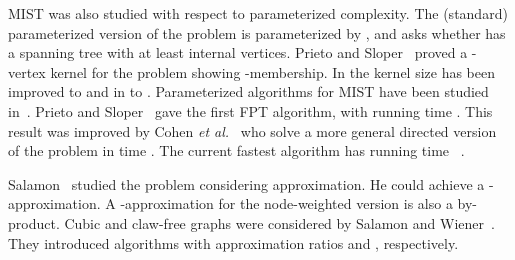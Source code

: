 \documentclass{llncs}
\newcommand{\longversion}[1]{#1}
\newcommand{\FPT}{\mbox{}}
\newcommand{\mist}{\textsc{MIST}\xspace}
\begin{document}
\mist was also studied with respect to parameterized complexity. The (standard) parameterized version of the problem is parameterized by , and asks
whether  
has a spanning tree with at least  internal vertices. Prieto and Sloper~\cite{PriSlo2003} proved a -vertex kernel for the problem showing
\FPT-membership. In \cite{\longversion{Pri2005,}PriSlo2005} the kernel size has been improved to  and in \cite{FominGST} to .
Parameterized algorithms for \mist have been studied in~\cite{CohenFGKSY09,FominGST,PriSlo2005}. Prieto and Sloper~\cite{PriSlo2005} gave the first
FPT algorithm, with running time . This result was improved by Cohen {\em et al.}~\cite{CohenFGKSY09} who solve a more
general directed version of the problem in time . The current fastest algorithm has running time ~\cite{FominGST}.

Salamon~\cite{Sal07} studied the problem considering approximation. He could achieve a -approximation. A -approximation for the node-weighted version is also a by-product. Cubic and claw-free graphs were considered by Salamon and Wiener~\cite{SalWie08}. They introduced algorithms with approximation ratios  and , respectively.
\end{document}
